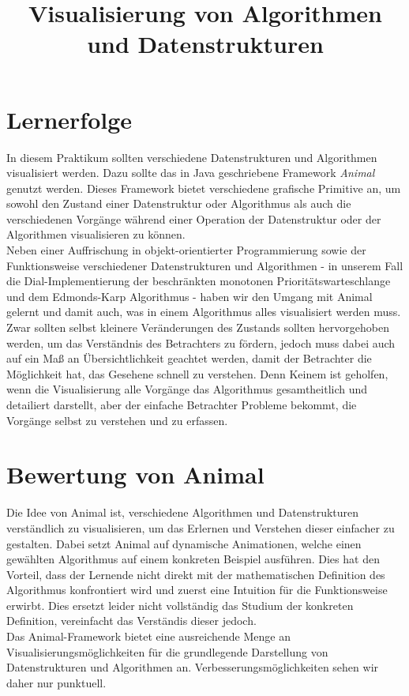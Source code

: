 \documentclass[solution]{report}
\title{Visualisierung von Algorithmen und Datenstrukturen}
\begin{document}
	\lstset{language=Java}
	\maketitle
	
	\chapter{Lernerfolge}
		In diesem Praktikum sollten verschiedene Datenstrukturen und Algorithmen visualisiert werden. Dazu sollte das in Java geschriebene Framework \textit{Animal} genutzt werden. Dieses Framework bietet verschiedene grafische Primitive an, um sowohl den Zustand einer Datenstruktur oder Algorithmus als auch die verschiedenen Vorgänge während einer Operation der Datenstruktur oder der Algorithmen visualisieren zu können.\\
		Neben einer Auffrischung in objekt-orientierter Programmierung sowie der Funktionsweise verschiedener Datenstrukturen und Algorithmen - in unserem Fall die Dial-Implementierung der beschränkten monotonen Prioritätswarteschlange und dem Edmonds-Karp Algorithmus - haben wir den Umgang mit Animal gelernt und damit auch, was in einem Algorithmus alles visualisiert werden muss. Zwar sollten selbst kleinere Veränderungen des Zustands sollten hervorgehoben werden, um das Verständnis des Betrachters zu fördern, jedoch muss dabei auch auf ein Maß an Übersichtlichkeit geachtet werden, damit der Betrachter die Möglichkeit hat, das Gesehene schnell zu verstehen.
		Denn Keinem ist geholfen, wenn die Visualisierung alle Vorgänge das Algorithmus gesamtheitlich und detailiert darstellt, aber der einfache Betrachter Probleme bekommt, die Vorgänge selbst zu verstehen und zu erfassen.
		
	\chapter{Bewertung von Animal}
		Die Idee von Animal ist, verschiedene Algorithmen und Datenstrukturen verständlich zu visualisieren, um das Erlernen und Verstehen dieser einfacher zu gestalten. Dabei setzt Animal auf dynamische Animationen, welche einen gewählten Algorithmus auf einem konkreten Beispiel ausführen. Dies hat den Vorteil, dass der Lernende nicht direkt mit der mathematischen Definition des Algorithmus konfrontiert wird und zuerst eine Intuition für die Funktionsweise erwirbt. Dies ersetzt leider nicht vollständig das Studium der konkreten Definition, vereinfacht das Verständis dieser jedoch.\\
		Das Animal-Framework bietet eine ausreichende Menge an Visualisierungsmöglichkeiten für die grundlegende Darstellung von Datenstrukturen und Algorithmen an. Verbesserungsmöglichkeiten sehen wir daher nur punktuell.
\end{document}
